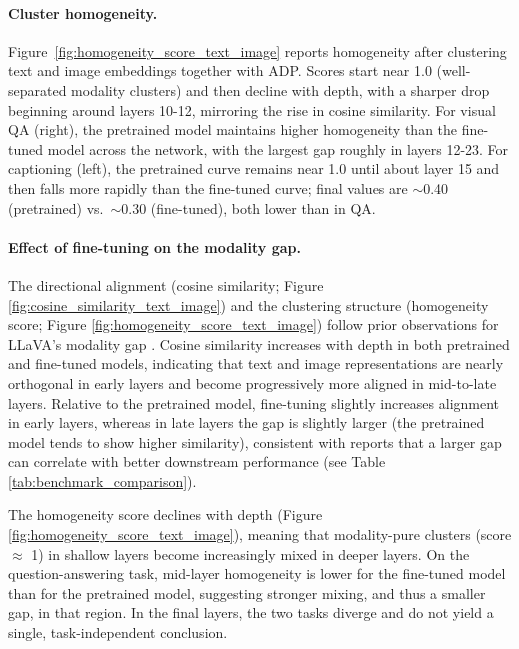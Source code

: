 \paragraph{Cluster homogeneity.}
Figure~\ref{fig:homogeneity_score_text_image} reports homogeneity after clustering text and image embeddings together with ADP. Scores start near 1.0 (well-separated modality clusters) and then decline with depth, with a sharper drop beginning around layers 10-12, mirroring the rise in cosine similarity. For visual QA (right), the pretrained model maintains higher homogeneity than the fine-tuned model across the network, with the largest gap roughly in layers 12-23. For captioning (left), the pretrained curve remains near 1.0 until about layer 15 and then falls more rapidly than the fine-tuned curve; final values are $\sim$0.40 (pretrained) vs.\ $\sim$0.30 (fine-tuned), both lower than in QA.

\paragraph{Effect of fine-tuning on the modality gap.}
The directional alignment (cosine similarity; Figure \ref{fig:cosine_similarity_text_image}) and the clustering structure (homogeneity score; Figure \ref{fig:homogeneity_score_text_image}) follow prior observations for LLaVA's modality gap \cite{serraNarrowGateLocalizeda}. Cosine similarity increases with depth in both pretrained and fine-tuned models, indicating that text and image representations are nearly orthogonal in early layers and become progressively more aligned in mid-to-late layers. Relative to the pretrained model, fine-tuning slightly increases alignment in early layers, whereas in late layers the gap is slightly larger (the pretrained model tends to show higher similarity), consistent with reports that a larger gap can correlate with better downstream performance \cite{liangMindGapUnderstanding2022} (see Table \ref{tab:benchmark_comparison}).

The homogeneity score declines with depth (Figure \ref{fig:homogeneity_score_text_image}), meaning that modality-pure clusters (score $\approx$ 1) in shallow layers become increasingly mixed in deeper layers. On the question-answering task, mid-layer homogeneity is lower for the fine-tuned model than for the pretrained model, suggesting stronger mixing, and thus a smaller gap, in that region. In the final layers, the two tasks diverge and do not yield a single, task-independent conclusion.

